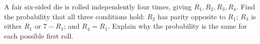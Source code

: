 A fair six-sided die is rolled independently four times, giving $R_1,R_2,R_3,R_4$. Find the probability that all three conditions hold: $R_2$ has parity opposite to $R_1$; $R_3$ is either $R_1$ or $7-R_1$; and $R_4=R_1$. Explain why the probability is the same for each possible first roll.
